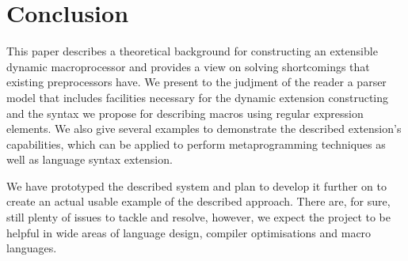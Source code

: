 \section{Conclusion}
This paper describes a theoretical background for constructing an extensible
dynamic macroprocessor and provides a view on solving shortcomings that
existing preprocessors have.  We present to the judjment of the reader a parser
model that includes facilities necessary for the dynamic extension
constructing and the syntax we propose for describing macros using regular
expression elements.  We also give several examples to demonstrate the
described extension's capabilities, which can be applied to perform
metaprogramming techniques as well as language syntax extension.  

We have prototyped the described system and plan to develop it further on to
create an actual usable example of the described approach. There are, for sure,
still plenty of issues to tackle and resolve, however, we expect the project to
be helpful in wide areas of language design, compiler optimisations and macro
languages.
